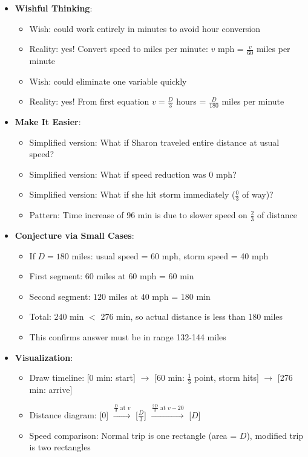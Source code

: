 \documentclass[11pt]{article}
\begin{document}
\begin{strategicbox}
\begin{itemize}[leftmargin=*]
    \item \textbf{Wishful Thinking}: 
    \begin{itemize}[leftmargin=*]
        \item Wish: could work entirely in minutes to avoid hour conversion
        \item Reality: yes! Convert speed to miles per minute: $v$ mph = $\frac{v}{60}$ miles per minute
        \item Wish: could eliminate one variable quickly
        \item Reality: yes! From first equation $v = \frac{D}{3}$ hours = $\frac{D}{180}$ miles per minute
    \end{itemize}
    
    \item \textbf{Make It Easier}: 
    \begin{itemize}[leftmargin=*]
        \item Simplified version: What if Sharon traveled entire distance at usual speed?
        \item Simplified version: What if speed reduction was 0 mph?
        \item Simplified version: What if she hit storm immediately ($\frac{0}{3}$ of way)?
        \item Pattern: Time increase of 96 min is due to slower speed on $\frac{2}{3}$ of distance
    \end{itemize}
    
    \item \textbf{Conjecture via Small Cases}: 
    \begin{itemize}[leftmargin=*]
        \item If $D = 180$ miles: usual speed = 60 mph, storm speed = 40 mph
        \item First segment: $60$ miles at $60$ mph = 60 min
        \item Second segment: $120$ miles at $40$ mph = 180 min
        \item Total: $240$ min $<$ 276 min, so actual distance is less than 180 miles
        \item This confirms answer must be in range 132-144 miles
    \end{itemize}
    
    \item \textbf{Visualization}: 
    \begin{itemize}[leftmargin=*]
        \item Draw timeline: [0 min: start] $\rightarrow$ [60 min: $\frac{1}{3}$ point, storm hits] $\rightarrow$ [276 min: arrive]
        \item Distance diagram: [0] $\xrightarrow{\frac{D}{3} \text{ at } v}$ [$\frac{D}{3}$] $\xrightarrow{\frac{2D}{3} \text{ at } v-20}$ [$D$]
        \item Speed comparison: Normal trip is one rectangle (area = $D$), modified trip is two rectangles
    \end{itemize}
\end{itemize}


\end{strategicbox}
\end{document}
